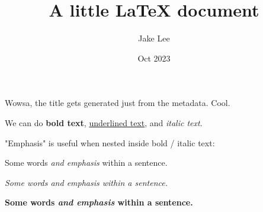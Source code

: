 \documentclass[12pt, letterpaper]{article}
\title{A little LaTeX document}
\author{Jake Lee}
\date{Oct 2023}
\begin{document}
\maketitle

Wowsa, the title gets generated just from the metadata. Cool.

We can do \textbf{bold text}, \underline{underlined text}, and \textit{italic text}.

"Emphasis" is useful when nested inside bold / italic text:

Some words \emph{and emphasis} within a sentence.

\textit{Some words \emph{and emphasis} within a sentence.}

\textbf{Some words \emph{and emphasis} within a sentence.}
\end{document}
